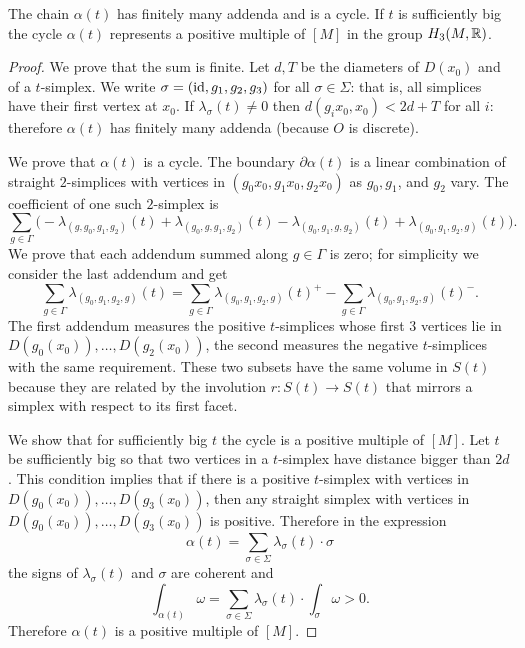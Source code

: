 \begin{lemma} \label{ciclo:lemma}
The chain $\alpha(t)$ has finitely many addenda and is a cycle. If $t$ is sufficiently big the cycle $\alpha(t)$ represents a positive multiple of $[M]$ in the group $H_3(M,\mathbb{R})$.
\end{lemma}
\begin{proof}
We prove that the sum is finite. Let $d, T$ be the diameters of $D(x_0)$ and of a $t$-simplex. 
We write $\sigma = ({\rm id},g_1,g_2,g_3)$ for all $\sigma \in \Sigma$: that is, all simplices have their first vertex at $x_0$. 
If $\lambda_\sigma(t)\neq 0$ then $d(g_ix_0, x_0) < 2d+T$ for all $i$: therefore $\alpha(t)$ has finitely many addenda (because $O$ is discrete).

We prove that $\alpha(t)$ is a cycle. The boundary $\partial \alpha(t)$ is a linear combination of straight $2$-simplices with vertices in $(g_0x_0, g_1x_0, g_2x_0)$ as $g_0, g_1$, and $g_2$ vary. The coefficient of one such $2$-simplex is
$$\sum_{g\in\Gamma} \big(- \lambda_{(g,g_0,g_1,g_2)}(t) + \lambda_{(g_0,g,g_1,g_2)}(t)
- \lambda_{(g_0,g_1,g,g_2)}(t) + \lambda_{(g_0,g_1,g_2,g)}(t)\big).$$
We prove that each addendum summed along $g\in \Gamma$ is zero; for simplicity we consider the last addendum and get
$$\sum_{g\in\Gamma} \lambda_{(g_0, g_1, g_{2}, g)}(t) = \sum_{g\in\Gamma} \lambda_{(g_0, g_1, g_{2}, g)}(t)^+ - \sum_{g\in\Gamma} \lambda_{(g_0, g_1, g_{2}, g)}(t)^-.$$
The first addendum measures the positive $t$-simplices whose first $3$ vertices lie in $D(g_0(x_0)), \ldots, D(g_2(x_0))$, the second measures the negative $t$-simplices with the same requirement. These two subsets have the same volume in $S(t)$ because they are related by the involution $r\colon S(t) \to S(t)$ that mirrors a simplex with respect to its first facet. 

We show that for sufficiently big $t$ the cycle is a positive multiple of $[M]$. Let $t$ be sufficiently big so that two vertices in a $t$-simplex have distance 
bigger than $2d$. This condition implies that if there is a positive $t$-simplex with vertices in $D(g_0(x_0)), \ldots, D(g_3(x_0))$, then any straight simplex with vertices in $D(g_0(x_0)), \ldots, D(g_3(x_0))$ is positive. 
Therefore in the expression
$$\alpha(t) = \sum_{\sigma \in \Sigma} \lambda_\sigma(t) \cdot \sigma$$
the signs of $\lambda_\sigma(t)$ and $\sigma$ are coherent and
$$\int_{\alpha(t)} \omega = \sum_{\sigma\in \Sigma} \lambda_\sigma(t) \cdot \int_{\sigma}\omega > 0.$$
Therefore $\alpha(t)$ is a positive multiple of $[M]$.
\end{proof}

